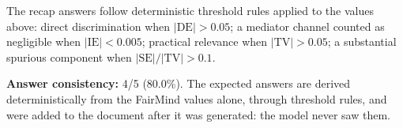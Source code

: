 \documentclass[11pt]{article}
\begin{document}
\vspace{1em}
\noindent\footnotesize
The recap answers follow deterministic threshold rules applied to the values above: direct discrimination when $|\mathrm{DE}| > 0.05$; a mediator channel counted as negligible when $|\mathrm{IE}| < 0.005$; practical relevance when $|\mathrm{TV}| > 0.05$; a substantial spurious component when $|\mathrm{SE}| / |\mathrm{TV}| > 0.1$.


\vspace{1em}
\noindent\textbf{Answer consistency:} 4/5 (80.0\%). The expected answers are derived deterministically from the FairMind values alone, through threshold rules, and were added to the document after it was generated: the model never saw them.
\end{document}
